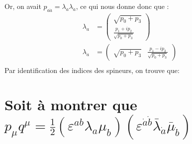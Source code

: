\documentclass[12pt, a4paper]{article}
\begin{document}
	Or, on avait \(p_{a \dot{a}}=\lambda_a \lambda_{\dot{a}}\), ce qui nous donne donc que :
	\begin{equation}
		\begin{split}
			\lambda_a &= \begin{pmatrix}
				\sqrt{p_0 + p_3}\\
				\frac{p_1+ip_2}{ \sqrt{p_0 + p_3}}
			\end{pmatrix}\\
			\lambda_{\dot{a}} &= \begin{pmatrix}
				\sqrt{p_0 + p_3} & \frac{p_1-ip_2}{ \sqrt{p_0 + p_3}}
			\end{pmatrix}\\
		\end{split}
	\end{equation}
	Par identification des indices des spineurs, on trouve que:
	
	\begin{center}
	\end{center}
	\section{Soit à montrer que \(p_{\mu}q^{\mu}=\frac{1}{2}(\varepsilon^{ab}\lambda_a \mu_b)(\varepsilon^{\dot{a}\dot{b}}\bar{\lambda}_{\dot{a}} \bar{\mu}_{\dot{b}})\)}
	
\end{document}
